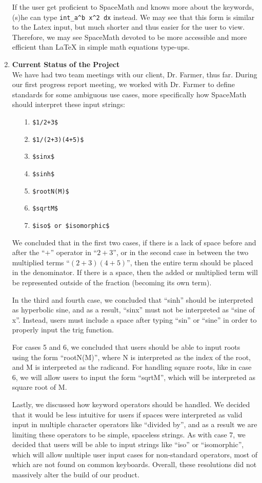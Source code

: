 \documentclass[11pt]{article}
\theoremstyle{definition}
\begin{document}
\begin{enumerate}
If the user get proficient to SpaceMath and knows more about the keywords, (s)he can type \verb|int_a^b x^2 dx| instead. We may see that this form is similar to the Latex input, but much shorter and thus easier for the user to view. Therefore, we may see SpaceMath devoted to be more accessible and more efficient than LaTeX in simple math equations type-ups.

\item \textbf{Current Status of the Project} \\
We have had two team meetings with our client, Dr. Farmer, thus far. During our first progress report meeting, we worked with Dr. Farmer to define standards for some ambiguous use cases, more specifically how SpaceMath should interpret these input strings:
\begin{enumerate}
\item[1.] \verb|$1/2+3$|
\item[2.] \verb|$1/(2+3)(4+5)$|
\item[3.] \verb|$sinx$|
\item[4.] \verb|$sinh$|
\item[5.] \verb|$rootN(M)$|
\item[6.] \verb|$sqrtM$|
\item[7.] \verb|$iso$ or $isomorphic$|
\end{enumerate}

We concluded that in the first two cases, if there is a lack of space before and after the  “$+$” operator in “$2+3$”, or in the second case in between the two multiplied terms “$(2+3)(4+5)$”, then the entire term should be placed in the denominator. If there is a space, then the added or multiplied term will be represented outside of the fraction (becoming its own term).

In the third and fourth case, we concluded that “sinh” should be interpreted as hyperbolic sine, and as a result, “sinx” must not be interpreted as “sine of x”. Instead, users must include a space after typing “sin” or “sine” in order to properly input the trig function.

For cases 5 and 6, we concluded that users should be able to input roots using the form “rootN(M)”, where N is interpreted as the index of the root, and M is interpreted as the radicand. For handling square roots, like in case 6, we will allow users to input the form “sqrtM”, which will be interpreted as square root of M.

Lastly, we discussed how keyword operators should be handled. We decided that it would be less intuitive for users if spaces were interpreted as valid input in multiple character operators like “divided by”, and as a result we are limiting these operators to be simple, spaceless strings. As with case 7, we decided that users will be able to input strings like “iso” or “isomorphic”, which will allow multiple user input cases for non-standard operators, most of which are not found on common keyboards. Overall, these resolutions did not massively alter the build of our product. \\


\end{enumerate}
\end{document}
